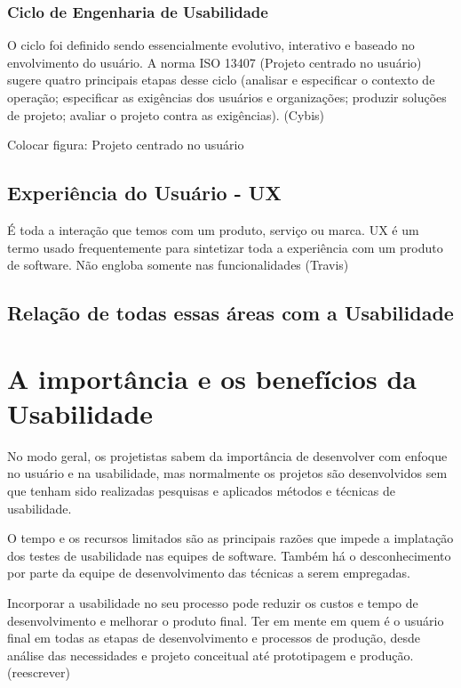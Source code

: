\subsubsection{Ciclo de Engenharia de Usabilidade}

	O ciclo foi definido sendo essencialmente evolutivo, interativo e baseado no envolvimento do usuário. A norma ISO 13407 (Projeto centrado no usuário) sugere quatro principais etapas desse ciclo (analisar e especificar o contexto de operação; especificar as exigências dos usuários e organizações; produzir soluções de projeto; avaliar o projeto contra as exigências). (Cybis)

Colocar figura: Projeto centrado no usuário

\subsection{Experiência do Usuário - UX}
É toda a interação que temos com um produto, serviço ou marca.
UX é um termo usado frequentemente para sintetizar toda a experiência com um produto de software. Não engloba  somente nas funcionalidades (Travis)


\subsection{Relação de todas essas áreas com a Usabilidade}

\section{A importância e os benefícios da Usabilidade}

No modo geral, os projetistas sabem da importância de desenvolver com enfoque no usuário e na usabilidade, mas normalmente os projetos são desenvolvidos sem que tenham sido realizadas pesquisas e aplicados métodos e técnicas de usabilidade.
	
	O tempo e os recursos limitados são as principais razões que impede a implatação dos testes de usabilidade nas equipes de software. Também há o desconhecimento por parte da equipe de desenvolvimento das técnicas a serem empregadas.

Incorporar a usabilidade no seu processo pode reduzir os custos e tempo de desenvolvimento e melhorar o produto final. Ter em mente  em quem é o usuário final em todas as etapas de desenvolvimento e processos de produção, desde análise das necessidades e projeto conceitual até prototipagem e produção.  (reescrever)

